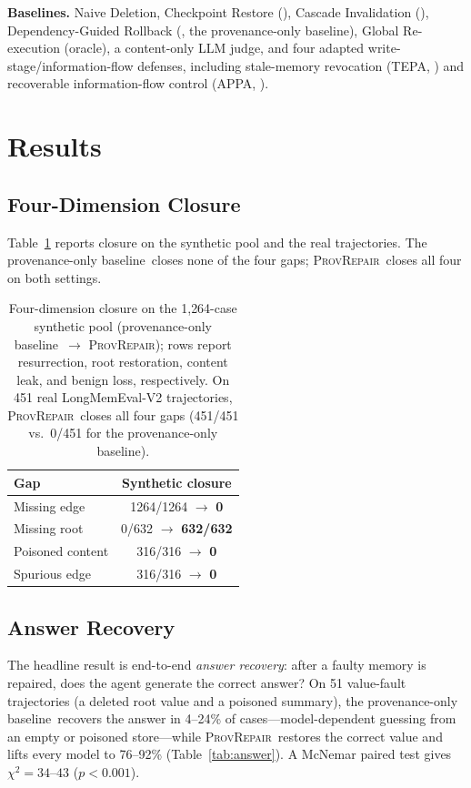 \documentclass[11pt]{article}
\theoremstyle{remark}
\newcommand{\ours}{\textsc{ProvRepair}}
\newcommand{\anchor}{provenance-only baseline}
\begin{document}
\textbf{Baselines.} Naive Deletion, Checkpoint Restore (\citet{su2026chronomem}),
Cascade Invalidation (\citet{zhao2026memorepair}), Dependency-Guided Rollback
(\citet{yu2026dependency}, the \anchor), Global Re-execution (oracle), a content-only
LLM judge, and four adapted write-stage/information-flow defenses, including stale-memory
revocation (TEPA, \citet{tepa2026}) and recoverable information-flow control (APPA,
\citet{kravchenko2026appa}).

\section{Results}
\label{sec:results}

\subsection{Four-Dimension Closure}
\label{sec:closure}

Table~\ref{tab:closure} reports closure on the synthetic pool and the real
trajectories. The \anchor\ closes none of the four gaps; \ours\ closes all four on
both settings.

\begin{table}[t]
\centering
\small
\begin{tabular}{lc}
\toprule
\textbf{Gap} & \textbf{Synthetic closure} \\
\midrule
Missing edge & 1264/1264 $\to$ \textbf{0} \\
Missing root & 0/632 $\to$ \textbf{632/632} \\
Poisoned content & 316/316 $\to$ \textbf{0} \\
Spurious edge & 316/316 $\to$ \textbf{0} \\
\bottomrule
\end{tabular}
\caption{Four-dimension closure on the 1{,}264-case synthetic pool (\anchor\ $\to$ \ours);
rows report resurrection, root restoration, content leak, and benign loss, respectively.
On 451 real LongMemEval-V2 trajectories, \ours\ closes all four gaps (451/451 vs.\ 0/451
for the \anchor).}
\label{tab:closure}
\end{table}

\subsection{Answer Recovery}
\label{sec:answer}

The headline result is end-to-end \emph{answer recovery}: after a faulty memory is
repaired, does the agent generate the correct answer? On 51 value-fault trajectories
(a deleted root value and a poisoned summary), the \anchor\ recovers the answer in
4--24\% of cases---model-dependent guessing from an empty or poisoned store---while
\ours\ restores the correct value and lifts every model to 76--92\%
(Table~\ref{tab:answer}). A McNemar paired test gives $\chi^2=34$--$43$ ($p<0.001$).
\end{document}
